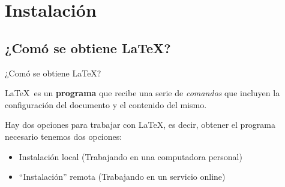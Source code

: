 \documentclass[11pt]{beamer}
\begin{document}
	\section{Instalación}
	\subsection{¿Comó se obtiene \LaTeX?}

		\begin{frame}{¿Comó se obtiene \LaTeX?}
			\justifying

			\LaTeX\ es un \textbf{programa} que recibe una serie de \textit{comandos}
			que incluyen la configuración del documento y el contenido del mismo.

			Hay dos opciones para trabajar con \LaTeX, es decir, obtener el programa
			necesario tenemos dos opciones:
			\begin{itemize}
				\item Instalación local (Trabajando en una computadora personal)
				\item ``Instalación'' remota (Trabajando en un servicio online)
			\end{itemize}
		\end{frame}
\end{document}
